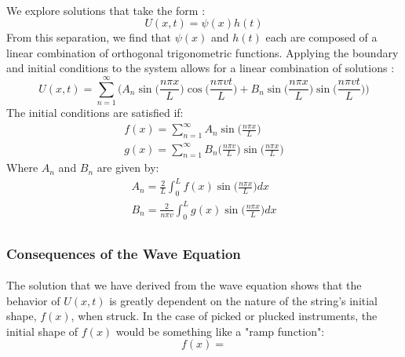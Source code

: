 \documentclass[12pt,letterpaper]{article}
\begin{document}
\paragraph*{}We explore solutions that take the form \cite{Haberman}:
\begin{equation}
U(x,t) = \psi(x)h(t)
\end{equation}
From this separation, we find that $\psi(x)$ and $h(t)$ each are composed of a linear combination of orthogonal trigonometric functions. Applying the boundary and initial conditions to the system allows for a linear combination of solutions \cite{Haberman}:
\begin{equation}
U(x,t) = 
\sum_{n=1}^{\infty} \bigg( A_n \sin\big(\frac{n\pi x}{L}\big)\cos\big(\frac{n\pi vt}{L}\big)
+ B_n \sin\big(\frac{n\pi x}{L}\big)\sin\big(\frac{n\pi vt}{L}\big) \bigg)
\end{equation}
The initial conditions are satisfied if:
\begin{equation}
\begin{array}{ll}
    f(x) = \sum_{n=1}^{\infty} A_n \sin\big(\frac{n\pi x}{L}\big) \\
    g(x) = \sum_{n=1}^{\infty} B_n\big(\frac{n\pi v}{L}\big)
    			\sin\big(\frac{n\pi x}{L}\big)
\end{array} 
\end{equation}
Where $A_n$ and $B_n$ are given by:
\begin{equation}
\begin{array}{ll}
    A_n = \frac{2}{L} \int_{0}^{L} f(x) \sin\big(\frac{n\pi x}{L}\big) dx \\
    B_n = \frac{2}{n\pi v} \int_{0}^{L} g(x) \sin\big(\frac{n\pi x}{L}\big) dx \\
\end{array} 
\end{equation} 

\subsubsection{Consequences of the Wave Equation}

\paragraph*{}The solution that we have derived from the wave equation shows that the behavior of $U(x,t)$ is greatly dependent on the nature of the string's initial shape, $f(x)$, when struck. In the case of picked or plucked instruments, the initial shape of $f(x)$ would be something like a "ramp function":
\begin{equation}
\label{eqn-RampFunc}
f(x) = 
\end{equation}
\end{document}
